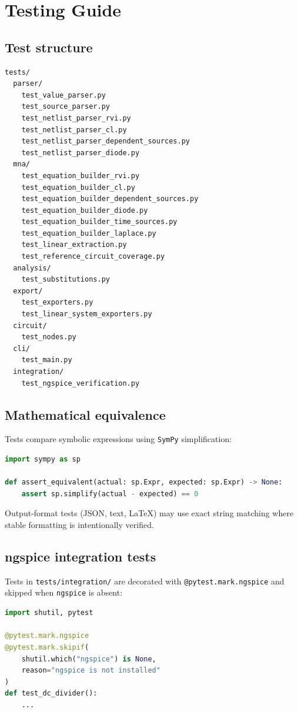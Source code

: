 \documentclass[11pt,a4paper]{article}
\newcommand{\code}[1]{\texttt{#1}}
\newcommand{\sympy}{\texttt{SymPy}}
\newcommand{\ngspice}{\texttt{ngspice}}
\begin{document}
\section{Testing Guide}
\label{sec:testing}

\subsection{Test structure}

\begin{lstlisting}
tests/
  parser/
    test_value_parser.py
    test_source_parser.py
    test_netlist_parser_rvi.py
    test_netlist_parser_cl.py
    test_netlist_parser_dependent_sources.py
    test_netlist_parser_diode.py
  mna/
    test_equation_builder_rvi.py
    test_equation_builder_cl.py
    test_equation_builder_dependent_sources.py
    test_equation_builder_diode.py
    test_equation_builder_time_sources.py
    test_equation_builder_laplace.py
    test_linear_extraction.py
    test_reference_circuit_coverage.py
  analysis/
    test_substitutions.py
  export/
    test_exporters.py
    test_linear_system_exporters.py
  circuit/
    test_nodes.py
  cli/
    test_main.py
  integration/
    test_ngspice_verification.py
\end{lstlisting}

\subsection{Mathematical equivalence}

Tests compare symbolic expressions using \sympy{} simplification:
\begin{lstlisting}[language=Python]
import sympy as sp

def assert_equivalent(actual: sp.Expr, expected: sp.Expr) -> None:
    assert sp.simplify(actual - expected) == 0
\end{lstlisting}

Output-format tests (JSON, text, LaTeX) may use exact string matching
where stable formatting is intentionally verified.

\subsection{ngspice integration tests}

Tests in \code{tests/integration/} are decorated with
\code{@pytest.mark.ngspice} and skipped when \ngspice{} is absent:
\begin{lstlisting}[language=Python]
import shutil, pytest

@pytest.mark.ngspice
@pytest.mark.skipif(
    shutil.which("ngspice") is None,
    reason="ngspice is not installed"
)
def test_dc_divider():
    ...
\end{lstlisting}
\end{document}
